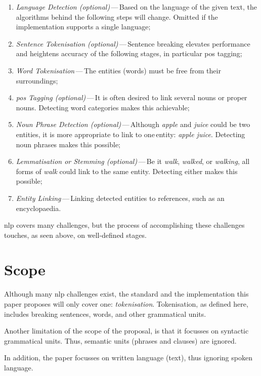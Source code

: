 \begin{enumerate}
\item\emph{Language Detection (optional)}\,---\,Based on the language of the
    given text, the algorithms behind the following steps will change.
  Omitted if the implementation supports a single language;
\item\emph{Sentence Tokenisation (optional)}\,---\,Sentence breaking elevates
    performance and heightens accuracy of the following stages, in
    particular \acrshort{pos} tagging;
\item\emph{Word Tokenisation}\,---\,The entities (words) must be free from
  their surroundings;
\item\emph{\gls{pos} Tagging (optional)}\,---\,It is often desired to link
    several nouns or proper nouns.
  Detecting word categories makes this achievable;
\item\emph{Noun Phrase Detection (optional)}\,---\,Although \emph{apple} and
    \emph{juice} could be two\,entities, it is more appropriate to link to
    one\,entity: \emph{apple juice}.
  Detecting noun phrases makes this possible;
\item\emph{Lemmatisation or Stemming (optional)}\,---\,Be it \emph{walk},
    \emph{walked}, or \emph{walking}, all forms of \emph{walk} could link
    to the same entity.
  Detecting either makes this possible;
\item\emph{Entity Linking}\,---\,Linking detected entities to references, such
    as an encyclopaedia.
\end{enumerate}

\noindent \gls{nlp} covers many challenges, but the process of accomplishing
  these challenges touches, as seen above, on well-defined stages.

\section{Scope}\label{scope}

Although many \gls{nlp} challenges exist, the standard and the implementation
  this paper proposes will only cover one: \emph{tokenisation}.
Tokenisation, as defined here, includes breaking sentences, words, and
other grammatical units.

Another limitation of the scope of the proposal, is that it focusses on
  syntactic grammatical units.
Thus, semantic units (phrases and clauses) are ignored.

In addition, the paper focusses on written language (text), thus ignoring
  spoken language.

